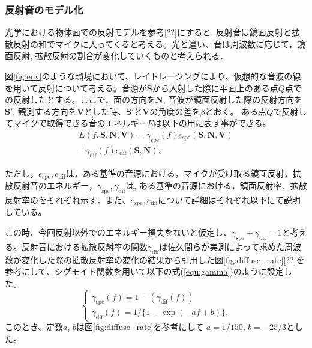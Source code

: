 \subsubsection{反射音のモデル化}
\label{sec:light_model}
光学における物体面での反射モデルを参考[??]にすると, 反射音は鏡面反射と拡散反射の和でマイクに入ってくると考える。光と違い、音は周波数に応じて，鏡面反射, 拡散反射の割合が変化していくものと考えられる．

図\ref{fig:env}のような環境において、レイトレーシングにより、仮想的な音波の線を用いて反射について考える。音源が$\mathbf{S}$から入射した際に平面上のある点$Q$点での反射したとする。ここで、面の方向を$\mathbf{N}$, 音波が鏡面反射した際の反射方向を$\mathbf{S'}$, 観測する方向を$\mathbf{V}$とした時、$\mathbf{S'}$と$\mathbf{V}$の角度の差を$\beta$とおく。
ある点$Q$で反射してマイクで取得できる音のエネルギー$E$は以下の用に表す事ができる。
\begin{equation}
\begin{aligned}
    \label{equ:all-reflection}
        E(f, \mathbf{S}, \mathbf{N}, \mathbf{V}) 
        = \gamma_\mathrm{spe}(f) e_\mathrm{spe}(\mathbf{S}, \mathbf{N}, \mathbf{V})\\
        + \gamma_\mathrm{dif}(f) e_\mathrm{dif}(\mathbf{S}, \mathbf{N}).
\end{aligned}
\end{equation}

ただし，$ e_\mathrm{spe}, e_\mathrm{dif} $は，ある基準の音源における，マイクが受け取る鏡面反射，拡散反射音のエネルギー，$\gamma_\mathrm{spe}, \gamma_\mathrm{dif} $は, ある基準の音源における，鏡面反射率、拡散反射率のをそれぞれ示す．また、$ e_\mathrm{spe}, e_\mathrm{dif} $について詳細はそれぞれ以下にて説明している。

この時、今回反射以外でのエネルギー損失をないと仮定し、$\gamma_\mathrm{spe} + \gamma_\mathrm{dif} = 1 $と考える。反射音における拡散反射率の関数$\gamma_\mathrm{dif}$は佐久間らが実測によって求めた周波数が変化した際の拡散反射率の変化の結果から引用した図\ref{fig:diffuse_rate}[??]を参考にして、シグモイド関数を用いて以下の式(\ref{equ:gamma})のように設定した。
\begin{equation}
    \label{equ:gamma}
    \left\{
    \begin{array}{l}
        \gamma_\mathrm{spe}(f) = 1 - (\gamma_\mathrm{dif}(f))\\
        \gamma_\mathrm{dif}(f) = 1/\{1-\exp(-af + b)\} .
    \end{array}
    \right.
\end{equation}
このとき、定数$a$, $b$は図\ref{fig:diffuse_rate}を参考にして $a=1/150$, $b=-25/3$とした。

